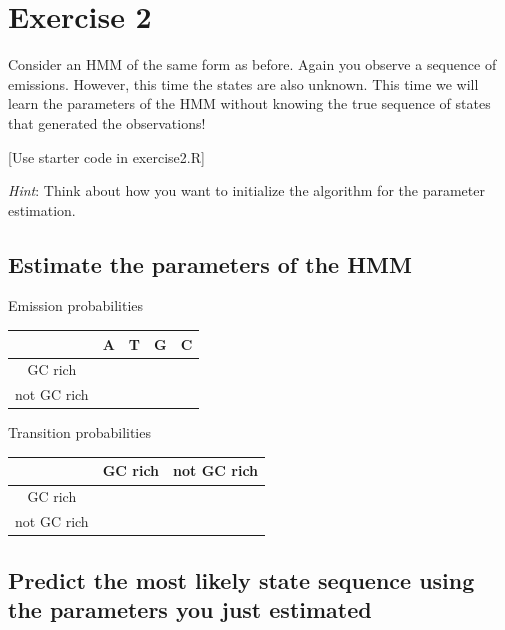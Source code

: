 \documentclass[11pt, oneside]{article}
\begin{document}
\section{Exercise 2}
Consider an HMM of the same form as before. 
Again you observe a sequence of emissions. 
However, this time the states are also unknown. 
This time we will learn the parameters of the HMM without knowing the true sequence of states that generated the observations! 

[Use starter code in exercise2.R]

\textit{Hint}: Think about how you want to initialize the algorithm for the parameter estimation. 

\subsection{Estimate the parameters of the HMM}
Emission probabilities
\begin{table}[H]
\centering
\begin{tabular}{|c|c|c|c|c|}
\hline
& A & T & G & C \\\hline
GC rich & & & &  \\\hline
not GC rich & & & & \\\hline
\end{tabular}
\end{table}

Transition probabilities
\begin{table}[H]
\centering
\begin{tabular}{|c|c|c|}
\hline
& GC rich & not GC rich \\\hline
GC rich & &  \\\hline
not GC rich & &  \\\hline
\end{tabular}
\end{table}

\subsection{Predict the most likely state sequence using the parameters you just estimated}
\end{document}
